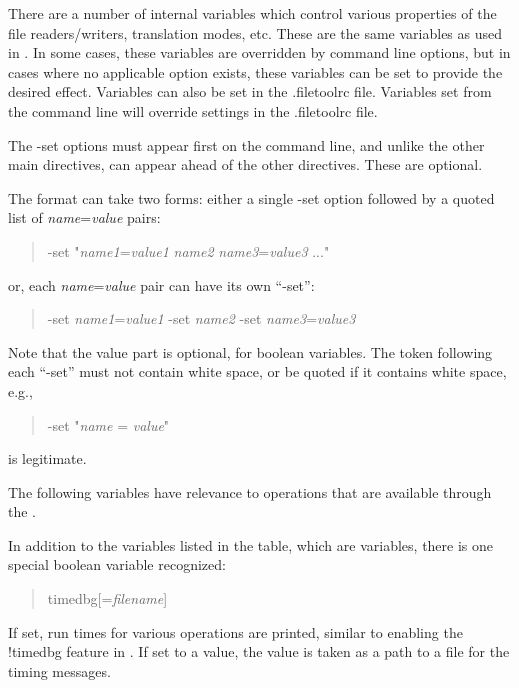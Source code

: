 There are a number of internal variables which control various
properties of the file readers/writers, translation modes, etc. 
These are the same variables as used in {\Xic}.  In some cases, these
variables are overridden by command line options, but in cases where
no applicable option exists, these variables can be set to provide
the desired effect.  Variables can also be set in the {\vt
.filetoolrc} file.  Variables set from the command line will override
settings in the {\vt .filetoolrc} file.

The {\vt -set} options must appear first on the command line, and
unlike the other main directives, can appear ahead of the other
directives.  These are optional.

The format can take two forms:  either a single {\vt -set} option
followed by a quoted list of {\it name\/}={\it value} pairs:
\begin{quote}
{\vt -set} {\vt "}{\it name1\/}={\it value1} {\it name2}
  {\it name3\/}={\it value3} ...{\vt "}
\end{quote}
or, each {\it name\/}={\it value} pair can have its own ``{\vt -set}'':
\begin{quote}
{\vt -set} {\it name1\/}={\it value1} {\vt -set} {\it name2}
  {\vt -set} {\it name3\/}={\it value3}
\end{quote}

Note that the value part is optional, for boolean variables.  The
token following each ``{\vt -set}'' must not contain white space, or
be quoted if it contains white space, e.g.,
\begin{quote}
{\vt -set} {\vt "}{\it name} = {\it value}{\vt "}
\end{quote}
is legitimate.

The following variables have relevance to operations that are
available through the {\FileTool}.

In addition to the variables listed in the table, which are {\Xic}
variables, there is one special boolean variable recognized: 
\begin{quote}
{\vt timedbg}[={\it filename\/}]
\end{quote}
If set, run times for various operations are printed, similar to
enabling the {\cb !timedbg} feature in {\Xic}.  If set to a value, the
value is taken as a path to a file for the timing messages. 

\newpage

